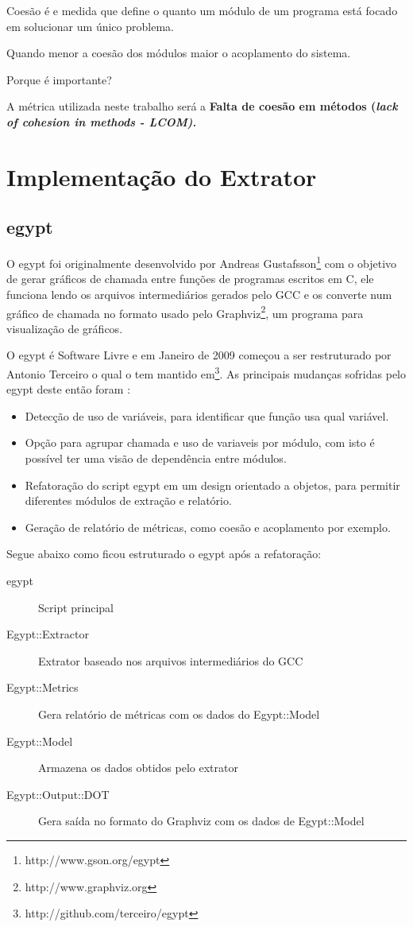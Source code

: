 Coesão é e medida que define o quanto um módulo de um programa está focado em
solucionar um único problema.

Quando menor a coesão dos módulos maior o acoplamento do sistema.

Porque é importante?

A métrica utilizada neste trabalho será a \bf{Falta de coesão em métodos}
(\it{lack of cohesion in methods} - LCOM).

\chapter{Implementação do Extrator} \label{ch:implementacao}

\section{egypt}

O egypt foi originalmente desenvolvido por Andreas
Gustafsson\footnote{http://www.gson.org/egypt} com o objetivo de gerar gráficos
de chamada entre funções de programas escritos em C, ele funciona lendo os
arquivos intermediários gerados pelo GCC e os
converte num gráfico de chamada no formato usado pelo
Graphviz\footnote{http://www.graphviz.org}, um programa para visualização de
gráficos.

O egypt é Software Livre e em Janeiro de 2009 começou a ser restruturado por
Antonio Terceiro o qual o tem mantido
em\footnote{http://github.com/terceiro/egypt}. As principais mudanças sofridas
pelo egypt deste então foram \cite{structuralComplexityEvolution}:

\begin{itemize}
\item Detecção de uso de variáveis, para identificar que função usa qual
variável.
\item Opção para agrupar chamada e uso de variaveis por módulo, com isto é
possível ter uma visão de dependência entre módulos.
\item Refatoração do script egypt em um design orientado a objetos, para
permitir diferentes módulos de extração e relatório.
\item Geração de relatório de métricas, como coesão e acoplamento por exemplo.
\end{itemize}

Segue abaixo como ficou estruturado o egypt após a refatoração:

\begin{description}
\item[egypt] Script principal
\item[Egypt::Extractor] Extrator baseado nos arquivos intermediários do GCC
\item[Egypt::Metrics] Gera relatório de métricas com os dados do Egypt::Model
\item[Egypt::Model] Armazena os dados obtidos pelo extrator
\item[Egypt::Output::DOT] Gera saída no formato do Graphviz com os dados de Egypt::Model
\end{description}


